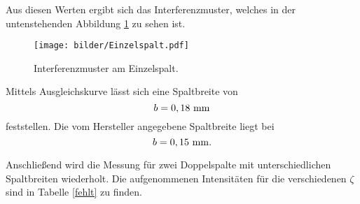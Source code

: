 Aus diesen Werten ergibt sich das Interferenzmuster, welches in der untenstehenden
Abbildung \ref{fig:eins} zu sehen ist.
\begin{figure}[H]
  \centering
  \texttt{[image: bilder/Einzelspalt.pdf]}
  \caption{Interferenzmuster am Einzelspalt.}
  \label{fig:eins}
\end{figure}
Mittels Ausgleichskurve lässt sich eine Spaltbreite von
\begin{equation*}
  b = 0,18\,\,\si{\milli\meter}
\end{equation*}
feststellen. Die vom Hersteller angegebene Spaltbreite liegt bei
\begin{equation*}
  b = 0,15\,\,\si{\milli\meter}.
\end{equation*}

Anschließend wird die Messung für zwei Doppelspalte mit unterschiedlichen Spaltbreiten
wiederholt. Die aufgenommenen Intensitäten für die verschiedenen $\zeta$ sind in
Tabelle \ref{fehlt} zu finden.
